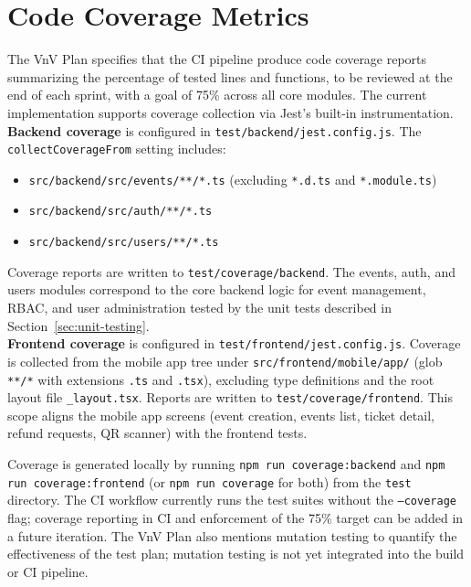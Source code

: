 \documentclass[12pt, titlepage]{article}
\begin{document}
\clearpage
\section{Code Coverage Metrics}
The VnV Plan specifies that the CI pipeline produce code coverage reports summarizing the percentage of tested lines and functions,
to be reviewed at the end of each sprint, with a goal of 75\% across all core modules. The current implementation supports coverage
collection via Jest's built-in instrumentation.\\

\textbf{Backend coverage} is configured in \texttt{test/backend/jest.config.js}. The \texttt{collectCoverageFrom} setting includes:
\begin{itemize}
\item \texttt{src/backend/src/events/**/*.ts} (excluding \texttt{*.d.ts} and \texttt{*.module.ts})
\item \texttt{src/backend/src/auth/**/*.ts}
\item \texttt{src/backend/src/users/**/*.ts}
\end{itemize}
Coverage reports are written to \texttt{test/coverage/backend}. The events, auth, and users modules correspond to the core backend logic for event management, RBAC, and user administration tested by the unit tests described in Section~\ref{sec:unit-testing}.\\

\textbf{Frontend coverage} is configured in \texttt{test/frontend/jest.config.js}. Coverage is collected from the mobile app tree under \texttt{src/frontend/mobile/app/} (glob \texttt{**/*} with extensions \texttt{.ts} and \texttt{.tsx}), excluding type definitions and the root layout file \texttt{\_layout.tsx}. Reports are written to \texttt{test/coverage/frontend}. This scope aligns the mobile app screens (event creation, events list, ticket detail, refund requests, QR scanner) with the frontend tests.

Coverage is generated locally by running \texttt{npm run coverage:backend} and \texttt{npm run coverage:frontend} (or \texttt{npm run coverage} for both) from the \texttt{test} directory. The CI workflow currently runs the test suites without the \texttt{--coverage} flag; coverage reporting in CI and enforcement of the 75\% target can be added in a future iteration. The VnV Plan also mentions mutation testing to quantify the effectiveness of the test plan; mutation testing is not yet integrated into the build or CI pipeline.
\end{document}

